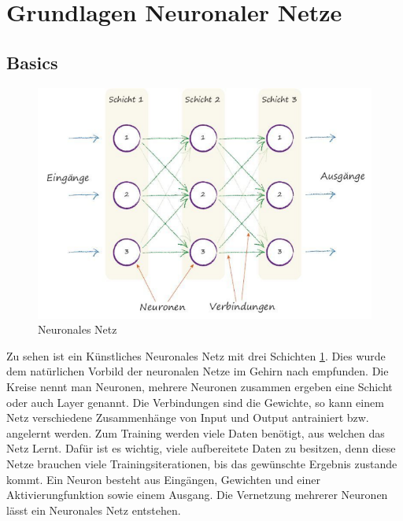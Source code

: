 \label{sec:grundlagen}
\section{Grundlagen Neuronaler Netze}
\label{sec:Grundlagen_Netze}
\subsection{Basics}
\begin{figure}[htb]
  \centering  
  \includegraphics[scale=0.5]{img/S36_Buildyourown.png}
  \caption{Neuronales Netz   \cite{rashid2017neuronale}}
  \label{fig:neural_network}
\end{figure}

Zu sehen ist ein Künstliches Neuronales Netz mit drei Schichten \ref{fig:neural_network}. Dies wurde dem natürlichen Vorbild der neuronalen Netze im Gehirn nach empfunden. Die Kreise nennt man Neuronen, mehrere Neuronen zusammen ergeben eine Schicht oder auch Layer genannt. Die Verbindungen sind die Gewichte, so kann einem Netz verschiedene Zusammenhänge von Input und Output antrainiert bzw. angelernt werden. Zum Training werden viele Daten benötigt, aus welchen das Netz \glqq Lernt\grqq{}. Dafür ist es wichtig, viele aufbereitete Daten zu besitzen, denn diese Netze brauchen viele Trainingsiterationen, bis das gewünschte Ergebnis zustande kommt. Ein Neuron besteht aus Eingängen, Gewichten und einer Aktivierungfunktion sowie einem Ausgang. Die Vernetzung mehrerer Neuronen lässt ein Neuronales Netz entstehen.

